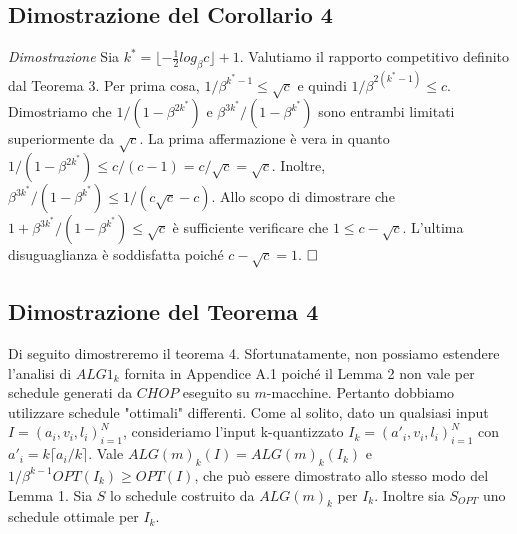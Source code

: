 \documentclass[12pt]{article}
\begin{document}
\subsection{Dimostrazione del Corollario 4}
\textit{Dimostrazione}
Sia $k^{*}  = \lfloor -\frac{1}{2} log_{\beta} c \rfloor + 1$. Valutiamo il rapporto competitivo definito dal Teorema 3. Per prima cosa, $1 / \beta^{k^{*}-1} \leq \sqrt{c}$ e quindi $1 / \beta^{2 (k^{*}  -1)} \leq c$. Dimostriamo che $1 / (1 - \beta^{2k^{*}})$ e $\beta^{3k^{*}} / (1 - \beta^{k^{*}})$ sono entrambi limitati superiormente da $\sqrt{c}$. La prima affermazione è vera in quanto $1 / (1 - \beta^{2k^{*}}) \leq c / (c - 1) = c / \sqrt{c} = \sqrt{c}$. Inoltre, $\beta^{3k^{*}} / (1 - \beta^{k^{*}}) \leq 1 / (c\sqrt{c} - c)$. Allo scopo di dimostrare che $1 + \beta^{3k^{*}} / (1 - \beta^{k^{*}}) \leq \sqrt{c}$ è sufficiente verificare che $1 \leq c - \sqrt{c}$. L'ultima disuguaglianza è soddisfatta poiché $c - \sqrt{c} = 1$. $\hfill \square$

\subsection{Dimostrazione del Teorema 4}
Di seguito dimostreremo il teorema 4. Sfortunatamente, non possiamo estendere l'analisi di $ALG1_{k}$ fornita in Appendice A.1 poiché il Lemma 2 non vale per schedule generati da $CHOP$ eseguito su $m$-macchine. Pertanto dobbiamo utilizzare schedule "ottimali" differenti.
Come al solito, dato un qualsiasi input $I = (a_{i}, v_{i}, l_{i})^{N}_{i = 1}$, consideriamo l'input k-quantizzato $I_{k} = (a'_{i}, v_{i}, l_{i})^{N}_{i = 1}$ con $a'_{i} = k \lceil a_{i} / k \rceil$. Vale $ALG(m)_{k}(I) = ALG(m)_{k}(I_{k})$ e $1 / \beta^{k-1}OPT (I_{k}) \geq OPT (I)$, che può essere dimostrato allo stesso modo del Lemma 1. Sia $S$ lo schedule costruito da $ALG(m)_{k}$ per $I_{k}$. Inoltre sia $S_{OPT}$ uno schedule ottimale per $I_{k}$. 
\end{document}
